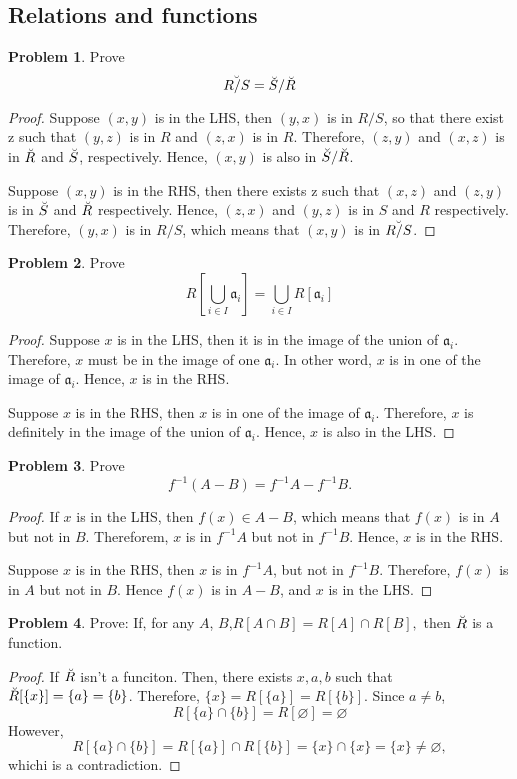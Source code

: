 \documentclass[a4paper,11pt]{article}%
\theoremstyle{remark}
\theoremstyle{definition}
\newtheorem{problem}{Problem}[subsection]
\begin{document}
\subsection{Relations and functions}
\begin{problem}
    Prove
    \[ \Breve{R/S}=\Breve{S}/\Breve{R}\]
\begin{proof}
    Suppose $(x,y)$ is in the LHS, then $(y,x)$ is in $R/S$,
    so that there exist z such that $(y,z)$ is in $R$ and $(z,x)$ is in $R$.
    Therefore, $(z,y)$ and $(x,z)$ is in $\Breve{R}$ and $\Breve{S}$, respectively.
    Hence, $(x,y)$ is also in $\Breve{S}/\Breve{R}$.

    Suppose $(x,y)$ is in the RHS, then there exists z such that $(x,z)$ and
    $(z,y)$ is in $\Breve{S}$ and $\Breve{R}$ respectively. Hence, $(z,x)$ and
    $(y,z)$ is in $S$ and $R$ respectively. Therefore, $(y,x)$ is in $R/S$, which
    means that $(x,y)$ is in $\Breve{R/S}$.
\end{proof}
\end{problem}
\begin{problem}
    Prove
        \[R[\bigcup_{i\in I}\mathfrak{a}_i]=\bigcup_{i\in I}R[\mathfrak{a}_i]\]
\begin{proof}
    Suppose $x$ is in the LHS, then it is in the image of the union of $\mathfrak{a}_i$.
    Therefore, $x$ must be in the image of one $\mathfrak{a}_i$. In other word,
    $x$ is in one of the image of $\mathfrak{a}_i$. Hence, $x$ is in the RHS.

    Suppose $x$ is in the RHS, then $x$ is in one of the image of $\mathfrak{a}_i$.
    Therefore, $x$ is definitely in the image of the union of $\mathfrak{a}_i$. Hence, $x$
    is also in the LHS.
\end{proof}
\end{problem}
\begin{problem}
    Prove
    \[f^{-1}(A-B)=f^{-1}A-f^{-1}B.\]
    \begin{proof}
        If $x$ is in the LHS, then $f(x)\in A-B$, which means that $f(x)$ is
        in $A$ but not in $B$. Thereforem, $x$ is in $f^{-1}A$ but not in $f^{-1}B$.
        Hence, $x$ is in the RHS.

        Suppose $x$ is in the RHS, then $x$ is in $f^{-1}A$, but not in $f^{-1}B$.
        Therefore, $f(x)$ is in $A$ but not in $B$. Hence $f(x)$ is in $A-B$, and 
        $x$ is in the LHS.
    \end{proof}
\end{problem}
\begin{problem}
    Prove: If, for any $A$, $B$,$R[A\cap B]=R[A]\cap R[B],$ then $\Breve{R}$ is a function.
    \begin{proof}
        If $\Breve{R}$ isn't a funciton. Then, there exists $x,a,b$ such that 
        $\Breve{R}[\{x\}]=\{a\}=\{b\}$. Therefore, $\{x\}=R[\{a\}]=R[\{b\}]$.
        Since $a\neq b$, 
        \[R[\{a\}\cap\{b\}]=R[\varnothing]=\varnothing\]
        However,
        \[R[\{a\}\cap\{b\}]=R[\{a\}]\cap R[\{b\}]=\{x\}\cap\{x\}=\{x\}\neq\varnothing,\]
        whichi is a contradiction.
    \end{proof}
\end{problem}
\end{document}
